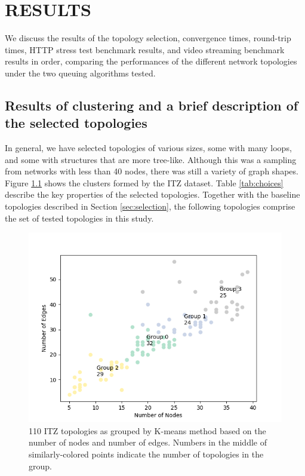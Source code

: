\chapter{RESULTS}
We discuss the results of the topology selection, convergence times, round-trip times, HTTP stress test benchmark results, and video streaming benchmark results in order, comparing the performances of the different network topologies under the two queuing algorithms tested.

\section{Results of clustering and a brief description of the selected topologies}

In general, we have selected topologies of various sizes, some with many loops, and some with structures that are more tree-like. Although this was a sampling from networks with less than 40 nodes, there was still a variety of graph shapes. Figure \ref{fig:groups} shows the clusters formed by the ITZ dataset. Table \ref{tab:choices} describe the key properties of the selected topologies. Together with the baseline topologies described in Section \ref{sec:selection}, the following topologies comprise the set of tested topologies in this study.

\begin{figure}
\centering
\includegraphics[width=\textwidth]{Figures/clusters.png}
    \caption{110 ITZ topologies as grouped by K-means method based on the number of nodes and number of edges. Numbers in the middle of similarly-colored points indicate the number of topologies in the group.}
    \label{fig:groups}
\end{figure}

